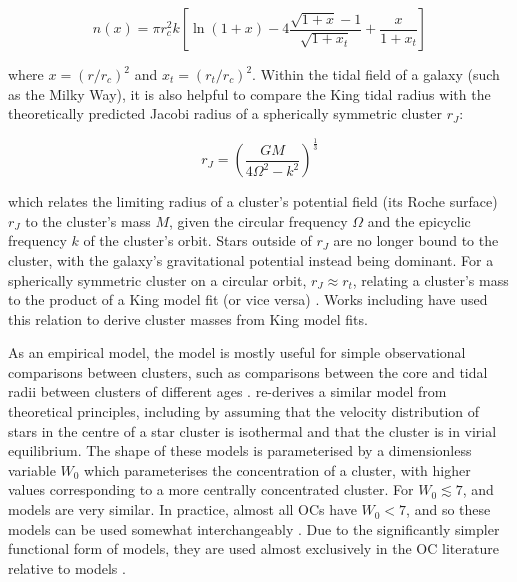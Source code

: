 \begin{equation}
	n(x) = \pi r_c^2 k \left[ \ln(1+x) - 4 \frac{\sqrt{1+x} - 1}{\sqrt{1 + x_t}} + \frac{x}{1 + x_t} \right]
\end{equation}

\noindent
where $x = (r / r_c)^2$ and $x_t = (r_t / r_c)^2$. Within the tidal field of a galaxy (such as the Milky Way), it is also helpful to compare the King tidal radius with the theoretically predicted Jacobi radius of a spherically symmetric cluster $r_J$:

\begin{equation}
	r_J = \left( \frac{GM}{4\Omega^2 - k^2} \right)^{\frac{1}{3}}
	\label{eqn:intro:jacobi_radius}
\end{equation}

\noindent %
which relates the limiting radius of a cluster's potential field (its Roche surface) $r_J$ to the cluster's mass $M$, given the circular frequency $\Omega$ and the epicyclic frequency $k$ of the cluster's orbit. Stars outside of $r_J$ are no longer bound to the cluster, with the galaxy's gravitational potential instead being dominant. For a spherically symmetric cluster on a circular orbit, $r_J \approx r_t$, relating a cluster's mass to the product of a King model fit (or vice versa) \citep{binney_galactic_1987}. Works including \citep{piskunov_tidal_2008} have used this relation to derive cluster masses from King model fits.

As an empirical model, the \cite{king_structure_star_1962} model is mostly useful for simple observational comparisons between clusters, such as comparisons between the core and tidal radii between clusters of different ages \citep{kharchenko_global_2013,tarricq_structural_2022}. \cite{king_structure_1966} re-derives a similar model from theoretical principles, including by assuming that the velocity distribution of stars in the centre of a star cluster is isothermal and that the cluster is in virial equilibrium. The shape of these models is parameterised by a dimensionless variable $W_0$ which parameterises the concentration of a cluster, with higher values corresponding to a more centrally concentrated cluster. For $W_0 \lesssim 7$, \cite{king_structure_star_1962} and \cite{king_structure_1966} models are very similar. In practice, almost all OCs have $W_0 < 7$, and so these models can be used somewhat interchangeably \citep{portegies_zwart_young_2010}. Due to the significantly simpler functional form of \cite{king_structure_star_1962} models, they are used almost exclusively in the OC literature relative to \cite{king_structure_1966} models \citep{portegies_zwart_young_2010,cantat-gaudin_milky_2022}.

